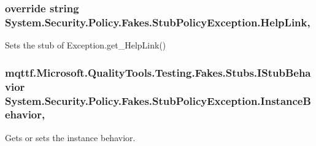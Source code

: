 \hypertarget{class_system_1_1_security_1_1_policy_1_1_fakes_1_1_stub_policy_exception_a3f5b9fed7dc12fb3c78593a24c88b2b3}{
\subsubsection[{Help\-Link}]{\setlength{\rightskip}{0pt plus 5cm}override string System.\-Security.\-Policy.\-Fakes.\-Stub\-Policy\-Exception.\-Help\-Link\hspace{0.3cm}{\ttfamily [get]}, {\ttfamily [set]}}}\label{class_system_1_1_security_1_1_policy_1_1_fakes_1_1_stub_policy_exception_a3f5b9fed7dc12fb3c78593a24c88b2b3}


Sets the stub of Exception.\-get\-\_\-\-Help\-Link()

\hypertarget{class_system_1_1_security_1_1_policy_1_1_fakes_1_1_stub_policy_exception_a0d2f5b112a8fac7ec7b52155ad5bd26c}{
\subsubsection[{Instance\-Behavior}]{\setlength{\rightskip}{0pt plus 5cm}mqttf.\-Microsoft.\-Quality\-Tools.\-Testing.\-Fakes.\-Stubs.\-I\-Stub\-Behavior System.\-Security.\-Policy.\-Fakes.\-Stub\-Policy\-Exception.\-Instance\-Behavior\hspace{0.3cm}{\ttfamily [get]}, {\ttfamily [set]}}}\label{class_system_1_1_security_1_1_policy_1_1_fakes_1_1_stub_policy_exception_a0d2f5b112a8fac7ec7b52155ad5bd26c}


Gets or sets the instance behavior.

